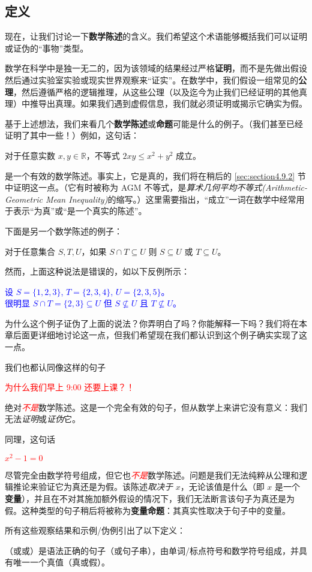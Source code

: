 \subsection{定义}

现在，让我们讨论一下\textbf{数学陈述}的含义。我们希望这个术语能够概括我们可以证明或证伪的``事物''类型。

数学在科学中是独一无二的，因为该领域的结果经过严格\textbf{证明}，而不是先做出假设然后通过实验室实验或现实世界观察来``证实''。在数学中，我们假设一组常见的\textbf{公理}，然后遵循严格的逻辑推理，从这些公理（以及迄今为止我们已经证明的其他真理）中推导出真理。如果我们遇到虚假信息，我们就必须证明或揭示它确实为假。

基于上述想法，我们来看几个\textbf{数学陈述}或\textbf{命题}可能是什么的例子。（我们甚至已经证明了其中一些！）例如，这句话：
\begin{center}
    \textcolor{olivegreen}{对于任意实数 $x, y \in \mathbb{R}$，不等式 $2xy \le x^2 + y^2$ 成立。}
\end{center}
是一个有效的数学陈述。事实上，它是真的，我们将在稍后的 \ref{sec:section4.9.2} 节中证明这一点。（它有时被称为 AGM 不等式，是\emph{算术几何平均不等式(Arithmetic-Geometric Mean Inequality)}的缩写。）这里需要指出，``成立''一词在数学中经常用于表示``为真''或``是一个真实的陈述''。

下面是另一个数学陈述的例子：
\begin{center}
    \textcolor{olivegreen}{对于任意集合 $S, T, U$，如果 $S \cap T \subseteq U$ 则 $S \subseteq U$ 或 $T \subseteq U$。}
\end{center}

然而，上面这种说法是错误的，如以下反例所示：
\begin{center}
    \textcolor{blue}{设 $S = \{1, 2, 3\}$, $T = \{2, 3, 4\}$, $U = \{2, 3, 5\}$。\\ 很明显 $S \cap T = \{2, 3\} \subseteq U$ 但 $S \nsubseteq U$ 且 $T \nsubseteq U$。}
\end{center}
为什么这个例子证伪了上面的说法？你弄明白了吗？你能解释一下吗？我们将在本章后面更详细地讨论这一点，但我们希望现在我们都认识到这个例子确实实现了这一点。

我们也都认同像这样的句子
\begin{center}
    \textcolor{red}{为什么我们早上 9:00 还要上课？！}
\end{center}
绝对\textcolor{red}{\emph{不是}}数学陈述。这是一个完全有效的句子，但从数学上来讲它没有意义：我们无法\emph{证明}或\emph{证伪}它。

同理，这句话
\begin{center}
    \textcolor{red}{$x^2 - 1 = 0$}
\end{center}
尽管完全由数学符号组成，但它也\textcolor{red}{\emph{不是}}数学陈述。问题是我们无法纯粹从公理和逻辑推论来验证它为真还是为假。该陈述\emph{取决于} $x$，无论该值是什么（即 $x$ 是一个\textbf{变量}），并且在不对其施加额外假设的情况下，我们无法断言该句子为真还是为假。这种类型的句子稍后将被称为\textbf{变量命题}：其真实性取决于句子中的变量。

所有这些观察结果和示例/伪例引出了以下定义：

\begin{definition}
    （或或）是语法正确的句子（或句子串），由单词/标点符号和数学符号组成，并具有唯一一个真值（真或假）。
\end{definition}
